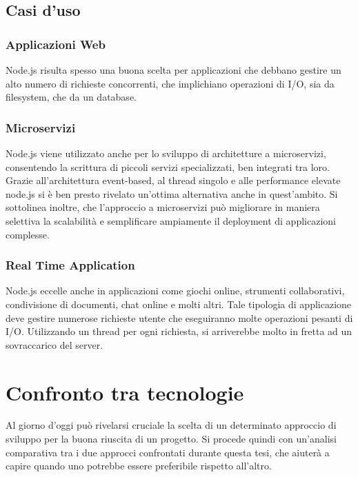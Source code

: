 \subsection{Casi d'uso}
\subsubsection{Applicazioni Web}
Node.js risulta spesso una buona scelta per applicazioni che debbano gestire un alto numero di richieste concorrenti, che implichiano operazioni di I/O, sia da filesystem, che da un database.
\subsubsection{Microservizi}
Node.js viene utilizzato anche per lo sviluppo di architetture a microservizi, consentendo la scrittura di piccoli servizi specializzati, ben integrati tra loro. Grazie all'architettura event-based, al thread singolo e alle performance elevate node.js si è ben presto rivelato un'ottima alternativa anche in quest'ambito. Si sottolinea inoltre, che l'approccio a microservizi può migliorare in maniera selettiva la scalabilità e semplificare ampiamente il deployment di applicazioni complesse.
\subsubsection{Real Time Application}
Node.js eccelle anche in applicazioni come giochi online, strumenti collaborativi, condivisione di documenti, chat online e molti altri. Tale tipologia di applicazione deve gestire numerose richieste utente che eseguiranno molte operazioni pesanti di I/O. Utilizzando un thread per ogni richiesta, si arriverebbe molto in fretta ad un sovraccarico del server.
\newpage
\section{Confronto tra tecnologie}
Al giorno d'oggi può rivelarsi cruciale la scelta di un determinato approccio di sviluppo per la buona riuscita di un progetto. Si procede quindi con un'analisi comparativa tra i due approcci confrontati durante questa tesi, che aiuterà a capire quando uno potrebbe essere preferibile rispetto all'altro.
\label{sec:Confronto}
